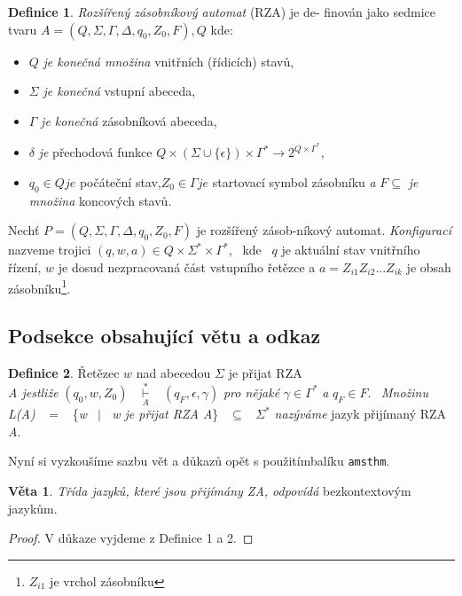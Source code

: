 \documentclass[a4paper, twocolumn,11pt]{article}
\theoremstyle{definition}
\newtheorem{definition}{Definice}
\newtheorem{sentence}{Věta}
\begin{document}
\begin{definition}\label{def1} \emph{Rozšířený zásobníkový automat} (RZA) je de- finován jako sedmice tvaru $A = (Q,\Sigma,\Gamma,\Delta, q_0 , Z_0 , F ), Q$ kde:
\begin{itemize}
    \item $Q$ \emph{je konečná množina} vnitřních (řídicích) stavů,
    \item $\Sigma$ \emph{je konečná} vstupní abeceda,
    \item $\Gamma$ \emph{je konečná} zásobníková abeceda,
    \item $\delta$ \emph{je} přechodová funkce $Q\times(\Sigma\cup\{\epsilon\})\times\Gamma^* \rightarrow 2^{Q\times\Gamma^*}$,
    \item $q_0 \in Q je$ počáteční stav,$Z_0 \in \Gamma je$ startovací symbol zásobníku \emph{a} $F \subseteq$ \emph{je množina} koncových stavů.
\end{itemize}

Nechť $P = (Q,\Sigma,\Gamma,\Delta, q_0 , Z_0 , F)$ je rozšířený zásob-níkový automat. \emph{Konfigurací} nazveme trojici $(q,w,a) \in Q \times \Sigma^*\times \Gamma^*$,~ kde~  $q$ je aktuální stav vnitřního řízení,
$w$ je dosud nezpracovaná část vstupního řetězce a $a = Z_{i1}Z_{i2}...Z_{ik}$ je obsah zásobníku\footnote{$Z_{i1}$ je vrchol zásobníku}.
\end{definition}
\subsection{Podsekce obsahující větu a odkaz}

\begin{definition}\label{def2}
 Řetězec $w$ nad abecedou $\Sigma$ je přijat RZA\\ \emph{A jestliže} $(q_0,w,Z_0)$~ 
$\overset{*}{\underset{A}{\vdash}}$~  $(q_F,\epsilon,\gamma)$ \emph{pro nějaké} $\gamma \in \Gamma^*$ \emph{a} $q_F \in F$.~ \emph{Množinu}~ \emph{L(A)}~ $=$~ \{\emph{w~ $|$~ w je přijat RZA A}\}~ $\subseteq$~ $\Sigma^*$
\emph{nazýváme} jazyk přijímaný RZA \emph{A}.


\end{definition}

Nyní si vyzkoušíme sazbu vět a důkazů opět s použitímbalíku \verb!amsthm!.
\begin{sentence}
\emph{Třída jazyků, které jsou přijímány ZA, odpovídá} bezkontextovým jazykům.
\begin{proof}
V důkaze vyjdeme z Definice 1 a 2. \end{proof}

\end{sentence}
\end{document}
